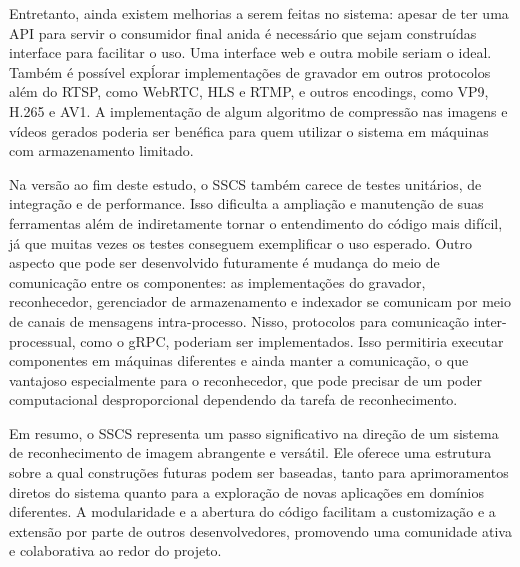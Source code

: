 \documentclass[12pt, %
openright, 
oneside, %
a4paper,    %
brazil]{facom-ufu-abntex2}
\begin{document}
Entretanto, ainda existem melhorias a serem feitas no sistema: apesar de ter
uma API para servir o consumidor final anida é necessário que sejam construídas
interface para facilitar o uso. Uma interface web e outra mobile seriam o
ideal. Também é possível expĺorar implementações de gravador em outros
protocolos além do RTSP, como WebRTC, HLS e RTMP, e outros encodings, como VP9,
H.265 e AV1. A implementação de algum algoritmo de compressão nas imagens e
vídeos gerados poderia ser benéfica para quem utilizar o sistema em máquinas
com armazenamento limitado.

Na versão ao fim deste estudo, o SSCS também carece de testes unitários, de
integração e de performance. Isso dificulta a ampliação e manutenção de suas
ferramentas além de indiretamente tornar o entendimento do código mais difícil,
já que muitas vezes os testes conseguem exemplificar o uso esperado. Outro
aspecto que pode ser desenvolvido futuramente é mudança do meio de comunicação
entre os componentes: as implementações do gravador, reconhecedor, gerenciador
de armazenamento e indexador se comunicam por meio de canais de mensagens
intra-processo. Nisso, protocolos para comunicação inter-processual, como o
gRPC, poderiam ser implementados. Isso permitiria executar componentes em
máquinas diferentes e ainda manter a comunicação, o que vantajoso especialmente
para o reconhecedor, que pode precisar de um poder computacional
desproporcional dependendo da tarefa de reconhecimento.

Em resumo, o SSCS representa um passo significativo na direção de um sistema de
reconhecimento de imagem abrangente e versátil. Ele oferece uma estrutura sobre
a qual construções futuras podem ser baseadas, tanto para aprimoramentos
diretos do sistema quanto para a exploração de novas aplicações em domínios
diferentes. A modularidade e a abertura do código facilitam a customização e a
extensão por parte de outros desenvolvedores, promovendo uma comunidade ativa e
colaborativa ao redor do projeto.

\postextual




\end{document}
